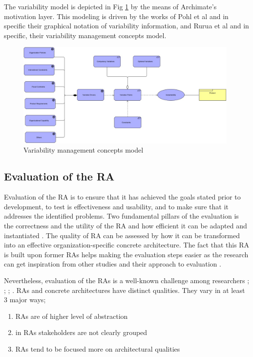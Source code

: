 \documentclass[review]{elsarticle}
\begin{document}
The variability model is depicted in Fig \ref{variability} by the means of Archimate's motivation layer. This modeling is driven by the works of Pohl et al \cite{pohl2005software} and in specific their graphical notation of variability information, and Rurua et al \cite{rurua2019representing} and in specific, their variability management concepts model.

\begin{figure}[h!]
    \centering
    \includegraphics[width=11cm]{variability-model.JPG}
    \caption{Variability management concepts model}
    \label{variability}
\end{figure}

\subsection{Evaluation of the RA}

Evaluation of the RA is to ensure that it has achieved the goals stated prior to development, to test is effectiveness and usability, and to make sure that it addresses the identified problems. Two fundamental pillars of the evaluation is the correctness and the utility of the RA and how efficient it can be adapted and instantiated \cite{galster2011empirically}. The quality of RA can be assessed by how it can be transformed into an effective organization-specific concrete architecture. The fact that this RA is built upon former RAs helps making the evaluation steps easier as the research can get inspiration from other studies and their approach to evaluation \cite{sharpe2019industrial}.

Nevertheless, evaluation of the RAs is a well-known challenge among researchers \cite{angelov2008contracting}; \cite{Avgeriou}; \cite{Cioroaica}; \cite{Maier}. RAs and concrete architectures have distinct qualities. They vary in at least 3 major ways;

\begin{enumerate}
    \item RAs are of higher level of abstraction
    \item in RAs stakeholders are not clearly grouped
    \item RAs tend to be focused more on architectural qualities
\end{enumerate}
\end{document}
